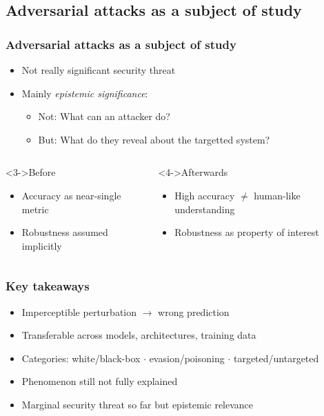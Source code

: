 \documentclass[t,english,aspectratio=169]{beamer}
\begin{document}
\subsection{Adversarial attacks as a subject of study}

\begin{frame}[c]
  \frametitle{Adversarial attacks as a subject of study}

  \begin{itemize}
    \item<1-> Not really significant security threat
    \item<2-> Mainly \emph{epistemic significance}:
    \begin{itemize}
      \item<2-> Not: What can an attacker do?
      \item<2-> But: What do they reveal about the targetted system?
    \end{itemize}
  \end{itemize}

  \vfill
  \begin{columns}[t]
    \begin{block}<3->{Before}
      \begin{itemize}
        \item Accuracy as near-single metric
        \item Robustness assumed implicitly
      \end{itemize}
    \end{block}

    \begin{block}<4->{Afterwards}
      \begin{itemize}
        \item High accuracy $\neq$ human-like understanding
        \item Robustness as property of interest
      \end{itemize}
    \end{block}
  \end{columns}
\end{frame}

\begin{frame}[c]
  \frametitle{Key takeaways}

  \begin{itemize}
    \item Imperceptible perturbation $\rightarrow$ wrong prediction
    \item Transferable across models, architectures, training data
    \item Categories: white/black-box $\cdot$ evasion/poisoning $\cdot$ targeted/untargeted
    \item Phenomenon still not fully explained
    \item Marginal security threat so far but epistemic relevance
  \end{itemize}
\end{frame}
\end{document}

